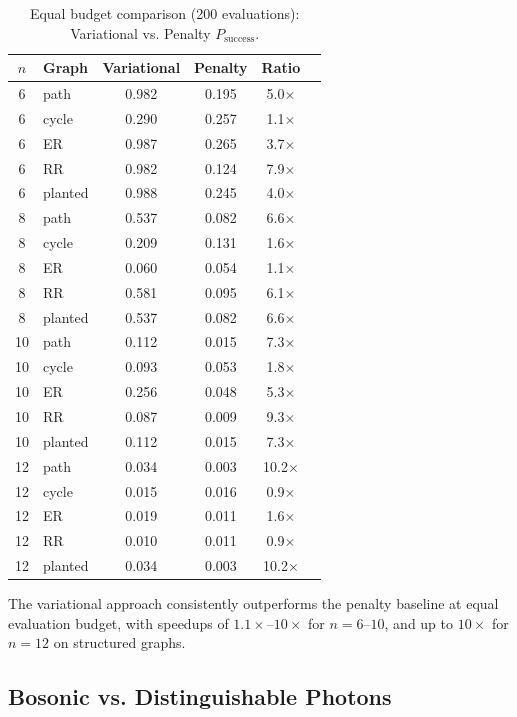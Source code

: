 \begin{table}[ht]
\centering
\caption{Equal budget comparison (200 evaluations): Variational vs. Penalty $P_{\mathrm{success}}$.}
\label{tab:equal_budget}
\begin{tabular}{clcccc}
\toprule
$n$ & Graph & Variational & Penalty & Ratio \\
\midrule
6 & path & 0.982 & 0.195 & 5.0$\times$ \\
6 & cycle & 0.290 & 0.257 & 1.1$\times$ \\
6 & ER & 0.987 & 0.265 & 3.7$\times$ \\
6 & RR & 0.982 & 0.124 & 7.9$\times$ \\
6 & planted & 0.988 & 0.245 & 4.0$\times$ \\
\midrule
8 & path & 0.537 & 0.082 & 6.6$\times$ \\
8 & cycle & 0.209 & 0.131 & 1.6$\times$ \\
8 & ER & 0.060 & 0.054 & 1.1$\times$ \\
8 & RR & 0.581 & 0.095 & 6.1$\times$ \\
8 & planted & 0.537 & 0.082 & 6.6$\times$ \\
\midrule
10 & path & 0.112 & 0.015 & 7.3$\times$ \\
10 & cycle & 0.093 & 0.053 & 1.8$\times$ \\
10 & ER & 0.256 & 0.048 & 5.3$\times$ \\
10 & RR & 0.087 & 0.009 & 9.3$\times$ \\
10 & planted & 0.112 & 0.015 & 7.3$\times$ \\
\midrule
12 & path & 0.034 & 0.003 & 10.2$\times$ \\
12 & cycle & 0.015 & 0.016 & 0.9$\times$ \\
12 & ER & 0.019 & 0.011 & 1.6$\times$ \\
12 & RR & 0.010 & 0.011 & 0.9$\times$ \\
12 & planted & 0.034 & 0.003 & 10.2$\times$ \\
\bottomrule
\end{tabular}
\end{table}

The variational approach consistently outperforms the penalty baseline at equal evaluation budget, with speedups of $1.1\times$--$10\times$ for $n=6$--$10$, and up to $10\times$ for $n=12$ on structured graphs.

\subsection{Bosonic vs. Distinguishable Photons}

